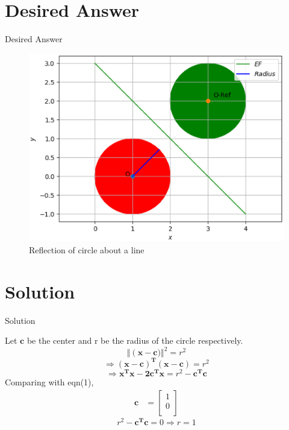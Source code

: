 \documentclass{beamer}
\begin{document}
\section{Desired Answer}
\begin{frame}{Desired Answer}
\begin{figure}[h]
\centering
\includegraphics[scale=0.54]{figs/circles.eps}
\caption{Reflection of circle about a line}
\label{etiqueta}
\end{figure}
\end{frame}

\section{Solution}
\begin{frame}{Solution}
\begin{solution}
Let $\boldsymbol{c}$ be the center and r be the radius of the circle respectively.
\begin{equation}
    \Vert\left(\boldsymbol{x - c}) \right\Vert^2 = r^2
\end{equation}
\begin{equation}
    \Rightarrow \boldsymbol{(x-c)^T(x-c)} = r^2
\end{equation}
\begin{equation}
    \Rightarrow \boldsymbol{x^Tx - 2c^Tx} = r^2 - \boldsymbol{c^Tc}
\end{equation}
Comparing with eqn(1),
\begin{align}
    \boldsymbol{c} &= \begin{bmatrix}
           1 \\
           0 \\
         \end{bmatrix}
\end{align}
\begin{equation}
    r^2 - \boldsymbol{c^Tc} = 0 \Rightarrow r = 1
\end{equation}  
\end{solution}
\end{frame}
\end{document}
